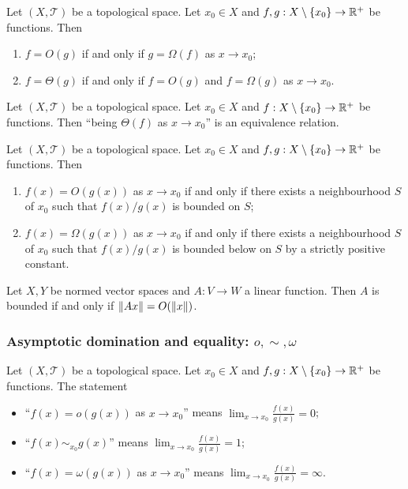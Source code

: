 \begin{lemma}
Let $(X,\mathcal{T})$ be a topological space. Let $x_0 \in X$ and $f,g: X\setminus\{x_0\}\to \mathbb{R}^+$ be functions. Then
\begin{enumerate}
\item $f = O(g)$ \textup{if and only if} $g = \Omega(f)$ as $x\to x_0$;
\item $f = \Theta(g)$ \textup{if and only if} $f = O(g)$ and $f = \Omega(g)$ as $x\to x_0$.
\end{enumerate}
\end{lemma}

\begin{lemma}
Let $(X,\mathcal{T})$ be a topological space. Let $x_0 \in X$ and $f: X\setminus\{x_0\}\to \mathbb{R}^+$ be functions. Then ``being $\Theta(f)$ as $x\to x_0$'' is an equivalence relation.
\end{lemma}

\begin{lemma}
Let $(X,\mathcal{T})$ be a topological space. Let $x_0 \in X$ and $f,g: X\setminus\{x_0\}\to \mathbb{R}^+$ be functions. Then
\begin{enumerate}
\item $f(x) = O(g(x))$ as $x\to x_0$ \textup{if and only if} there exists a neighbourhood $S$ of $x_0$ such that $f(x)/g(x)$ is bounded on $S$;
\item $f(x) = \Omega(g(x))$ as $x\to x_0$ \textup{if and only if} there exists a neighbourhood $S$ of $x_0$ such that $f(x)/g(x)$ is bounded below on $S$ by a strictly positive constant.
\end{enumerate}
\end{lemma}

\begin{lemma} \label{asymptoticsBoundedFunctionNormedSpaces}
Let $X,Y$ be normed vector spaces and $A: V\to W$ a linear function. Then $A$ is bounded \textup{if and only if} $\lVert Ax\rVert = O(\lVert x\rVert)$.
\end{lemma}

\subsubsection{Asymptotic domination and equality: $o,\sim,\omega$}
\begin{definition}
Let $(X,\mathcal{T})$ be a topological space. Let $x_0 \in X$ and $f,g: X\setminus\{x_0\}\to \mathbb{R}^+$ be functions. The statement
\begin{itemize}
\item ``$f(x) = o(g(x))$ as $x\to x_0$'' means $\lim_{x\to x_0} \frac{f(x)}{g(x)} = 0$;
\item ``$f(x) \sim_{x_0} g(x)$'' means $\lim_{x\to x_0} \frac{f(x)}{g(x)} = 1$;
\item ``$f(x) = \omega(g(x))$ as $x\to x_0$'' means $\lim_{x\to x_0} \frac{f(x)}{g(x)} = \infty$.
\end{itemize}
\end{definition}

